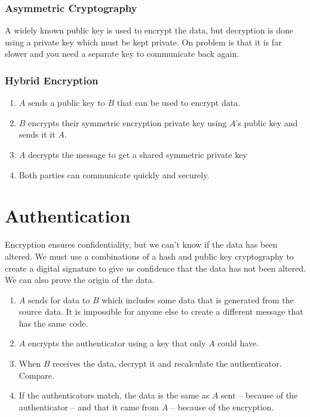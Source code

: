 \subsubsection{Asymmetric Cryptography}\label{ssub:asymmetric_cryptography}

A widely known public key is used to encrypt the data, but decryption is done using a private key which must be kept private.
On problem is that it is far slower and you need a separate key to communicate back again.

\subsubsection{Hybrid Encryption}\label{ssub:hybrid_encryption}

\begin{enumerate}
	\item \(A\) sends a public key to \(B\) that can be used to encrypt data.
	\item \(B\) encrypts their symmetric encryption private key using \(A\)'s public key and sends it it \(A\).
	\item \(A\) decrypts the message to get a shared symmetric private key
	\item Both parties can communicate quickly and securely.
\end{enumerate}

\section{Authentication}\label{sec:authentication}

Encryption ensures confidentiality, but we can't know if the data has been altered.
We must use a combinations of a hash and public key cryptography to create a digital signature to give us confidence that the data has not been altered.
We can also prove the origin of the data.

\begin{enumerate}
	\item \(A\) sends for data to \(B\) which includes some data that is generated from the source data.
	      It is impossible for anyone else to create a different message that has the same code.
	\item \(A\) encrypts the authenticator using a key that only \(A\) could have.
	\item When \(B\) receives the data, decrypt it and recalculate the authenticator.
	      Compare.
	\item If the authenticators match, the data is the same as \(A\) sent -- because of the authenticator -- and that it came from \(A\) -- because of the encryption.
\end{enumerate}

